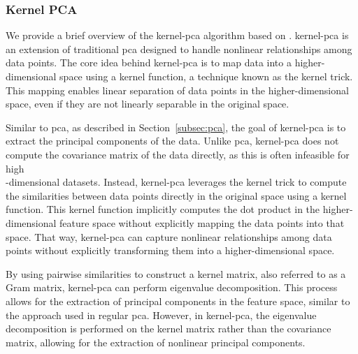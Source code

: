 \subsubsection{Kernel PCA}
We provide a brief overview of the \gls{kernel-pca} algorithm based on \citet{learningwithkernels}.
\gls{kernel-pca} is an extension of traditional \gls{pca} designed to handle nonlinear relationships among data points.
The core idea behind \gls{kernel-pca} is to map data into a higher-dimensional space using a kernel function, a technique known as the kernel trick.
This mapping enables linear separation of data points in the higher-dimensional space, even if they are not linearly separable in the original space.

Similar to \gls{pca}, as described in Section~\ref{subsec:pca}, the goal of \gls{kernel-pca} is to extract the principal components of the data.
Unlike \gls{pca}, \gls{kernel-pca} does not compute the covariance matrix of the data directly, as this is often infeasible for high\\-dimensional datasets.
Instead, \gls{kernel-pca} leverages the kernel trick to compute the similarities between data points directly in the original space using a kernel function.
This kernel function implicitly computes the dot product in the higher-dimensional feature space without explicitly mapping the data points into that space.
That way, \gls{kernel-pca} can capture nonlinear relationships among data points without explicitly transforming them into a higher-dimensional space.

By using pairwise similarities to construct a kernel matrix, also referred to as a Gram matrix, \gls{kernel-pca} can perform eigenvalue decomposition.
This process allows for the extraction of principal components in the feature space, similar to the approach used in regular \gls{pca}.
However, in \gls{kernel-pca}, the eigenvalue decomposition is performed on the kernel matrix rather than the covariance matrix, allowing for the extraction of nonlinear principal components.